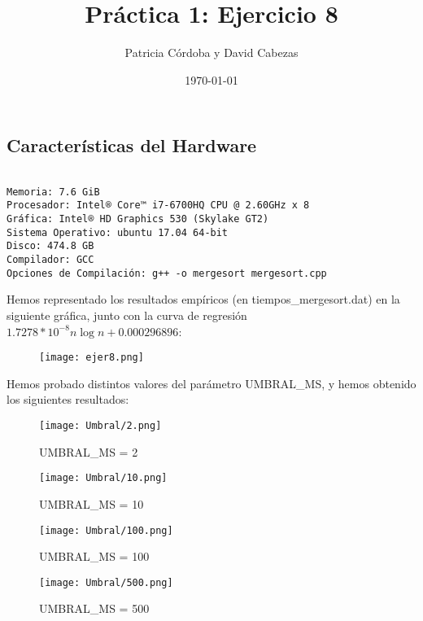 \documentclass{article}
\begin{document}
\title{Práctica 1: Ejercicio 8}
\author{Patricia Córdoba y David Cabezas}
\date{\today}
\maketitle

\subsection*{Características del Hardware}
\begin{verbatim}

Memoria: 7.6 GiB
Procesador: Intel® Core™ i7-6700HQ CPU @ 2.60GHz x 8
Gráfica: Intel® HD Graphics 530 (Skylake GT2)
Sistema Operativo: ubuntu 17.04 64-bit
Disco: 474.8 GB
Compilador: GCC
Opciones de Compilación: g++ -o mergesort mergesort.cpp

\end{verbatim}

\begin{justify}
  Hemos representado los resultados empíricos (en tiempos\_mergesort.dat) en la siguiente gráfica, junto con la curva de regresión $1.7278*10^{-8}n\log{n} + 0.000296896$:
\end{justify}

\begin{figure}[H]
  \centering
  \texttt{[image: ejer8.png]}
\end{figure}

\begin{justify}
  Hemos probado distintos valores del parámetro UMBRAL\_MS, y hemos
  obtenido los siguientes resultados:
\end{justify}

\begin{figure}[H]
  \caption{UMBRAL\_MS = 2}
  \centering
  \texttt{[image: Umbral/2.png]}
\end{figure}

\begin{figure}[H]
  \caption{UMBRAL\_MS = 10}
  \centering
  \texttt{[image: Umbral/10.png]}
\end{figure}


\begin{figure}[H]
  \caption{UMBRAL\_MS = 100}
  \centering
  \texttt{[image: Umbral/100.png]}
\end{figure}

\begin{figure}[H]
  \caption{UMBRAL\_MS = 500}
  \centering
  \texttt{[image: Umbral/500.png]}
\end{figure}
\end{document}
